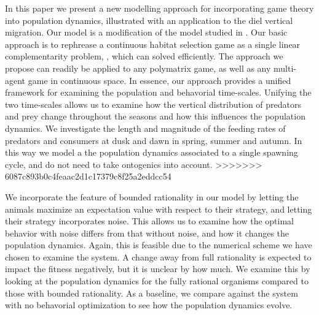 In this paper we present a new modelling approach for incorporating game theory into population dynamics, illustrated with an application to the diel vertical migration. Our model is a modification of the model studied in \citep{verticalmigration}. Our basic approach is to rephrease a continuous habitat selection game as a single linear complementarity problem, \citep{miller1991copositive}, which can solved efficiently. The approach we propose can readily be applied to any polymatrix game, as well as any multi-agent game in continuous space. In essence, our approach provides a unified framework for examining the population and behavorial time-scales.  Unifying the two time-scales allows us to examine how the vertical distribution of predators and prey change throughout the seasons and how this influences the population dynamics. We investigate the length and magnitude of the feeding rates of predators and consumers at dusk and dawn in spring, summer and autumn. In this way we model a the population dynamics associated to a single spawning cycle, and do not need to take ontogenics into account.
>>>>>>> 6087c893b0c4feaac2d1c17379c8f25a2eddcc54

We incorporate the feature of bounded rationality in our model by letting the animals maximize an expectation value with respect to their strategy, and letting their strategy incorporates noise. This allows us to examine how the optimal behavior with noise differs from that without noise, and how it changes the population dynamics. Again, this is feasible due to the numerical scheme we have chosen to examine the system. A change away from full rationality is expected to impact the fitness negatively, but it is unclear by how much. We examine this by looking at the population dynamics for the fully rational organisms compared to those with bounded rationality. As a baseline, we compare against the system with no behavorial optimization to see how the population dynamics evolve.





